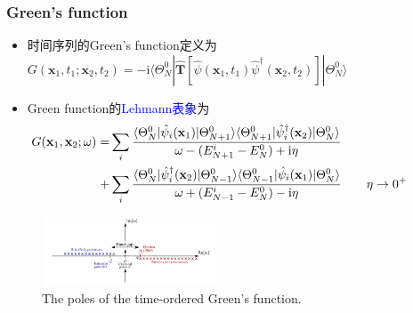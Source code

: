 \frame
{
	\frametitle{\textrm{Green's function}}
	\begin{itemize}
\vspace{-7pt}
		\item 时间序列的\textrm{Green's function}定义为$G(\mathbf{x}_1,t_1;\mathbf{x}_2,t_2)=-\mathrm{i}\langle\Theta_N^0|\hat{\mathbf{T}}[\hat\psi(\mathbf{x}_1,t_1)\hat\psi^{\dag}(\mathbf{x}_2,t_2)]|\Theta_N^0\rangle$
		\item \textrm{Green function}的\textcolor{blue}{\textrm{Lehmann}表象}为
			\begin{displaymath}
				\begin{aligned}
					\hspace*{-35pt}
					G(\mathbf{x}_1,\mathbf{x}_2;\omega)=&\sum\limits_i\dfrac{\langle\Theta_N^0|\hat\psi_i(\mathbf{x}_1)|\Theta_{N+1}^0\rangle\langle\Theta_{N+1}^0|\hat\psi_i^{\dag}(\mathbf{x}_2)|\Theta_N^0\rangle}{\omega-(E_{N+1}^i-E_N^0)+\mathrm{i}\eta}\\
					+&\sum\limits_i\dfrac{\langle\Theta_N^0|\hat\psi_i^{\dag}(\mathbf{x}_2)|\Theta_{N-1}^0\rangle\langle\Theta_{N-1}^0|\hat\psi_i(\mathbf{x}_1)|\Theta_N^0\rangle}{\omega+(E_{N-1}^i-E_N^0)-\mathrm{i}\eta}\qquad\eta\rightarrow0^+
				\end{aligned}
			\end{displaymath}
			{\fontsize{6.2pt}{6.2pt}}
	\end{itemize}
\begin{figure}[h!]
\centering
\vspace{-5pt}
\includegraphics[height=0.80in,width=2.05in,viewport=30 1 660 265,clip]{Figures/GW-0.png}
\caption{\textrm{\tiny{The poles of the time-ordered Green's function.}}}%
\label{GW-0}
\end{figure}
}

